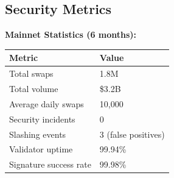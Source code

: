 \subsection{Security Metrics}

\textbf{Mainnet Statistics (6 months):}
\begin{table}[h]
\centering
\begin{tabular}{@{}ll@{}}
\toprule
\textbf{Metric} & \textbf{Value} \\
\midrule
Total swaps & 1.8M \\
Total volume & \$3.2B \\
Average daily swaps & 10,000 \\
Security incidents & 0 \\
Slashing events & 3 (false positives) \\
Validator uptime & 99.94\% \\
Signature success rate & 99.98\% \\
\bottomrule
\end{tabular}

\label{tab:mainnet-stats}
\end{table}

